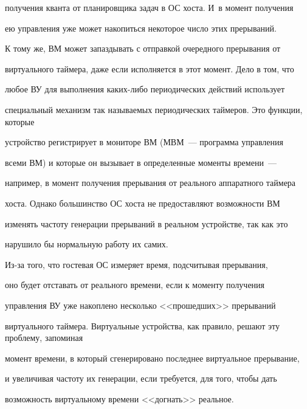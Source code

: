 получения кванта от планировщика задач в ОС хоста. И~в момент получения 


ею управления уже может накопиться некоторое число этих прерываний.


     


     К тому же, ВМ может запаздывать с отправкой очередного прерывания от 


виртуального таймера, даже если исполняется в этот момент. Дело в том, что 


любое ВУ для выполнения каких-либо периодических действий использует 


специальный механизм так называемых периодических таймеров. Это функции, которые 


устройство регистрирует в мониторе ВМ (МВМ~--- программа управ\-ле\-ния 


всеми ВМ) и которые он вызывает в определенные моменты времени~--- 


например, в момент получения прерывания от реального аппаратного таймера 


хоста. Однако большинство ОС хоста не предоставляют возможности ВМ 


изменять час\-то\-ту генерации прерываний в реальном устройстве, так как это 


нарушило бы нормальную работу их самих.


     


     Из-за того, что гостевая ОС измеряет время, подсчитывая прерывания, 


оно будет отставать от реального времени, если к моменту получения 


управления ВУ уже накоплено несколько <<прошедших>> прерываний 


виртуального таймера. Виртуальные устройства, как правило, решают эту проблему, запоминая 


момент времени, в который сгенерировано последнее виртуальное прерывание,


и увеличивая частоту их генерации, если требуется, для того, чтобы дать 


возможность виртуальному времени <<догнать>> реальное.


 


